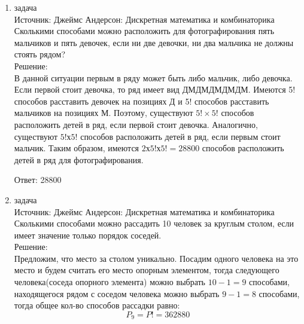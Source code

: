 \documentclass[a4paper,14pt]{extreport} %
\begin{document}
\begin{center}
\begin{enumerate}
						
						
						
						
						
						
						
						
						
						
						
						
						\item {\large задача  }\\
						Источник: Джеймс Андерсон: Дискретная математика и комбинаторика\\
						\vspace{15pt}
						Сколькими способами можно расположить для фотографирования
						пять мальчиков и пять девочек, если ни две девочки, ни два мальчика не должны
						стоять рядом? \\
						\vspace{15pt}
						Решение:\\
						В данной ситуации первым в ряду может быть либо мальчик,
						либо девочка. Если первой стоит девочка, то ряд имеет вид ДМДМДМДМДМ.
						Имеются 5! способов расставить девочек на позициях Д и 5! способов расставить
						мальчиков на позициях М. Поэтому, существуют $5! \times 5!$ способов расположить
						детей в ряд, если первой стоит девочка. Аналогично, существуют $5! х 5!$ способов
						расположить детей в ряд, если первым стоит мальчик. Таким образом, имеются
						$2 х 5! х 5! = 28800$ способов расположить детей в ряд для фотографирования.
					
						Ответ: 28800
						
						 \item {\large задача  }\\
						Источник: Джеймс Андерсон: Дискретная математика и комбинаторика\\
						\vspace{15pt}
						Сколькими способами можно рассадить 10 человек за круглым
						столом, если имеет значение только порядок соседей.\\
						\vspace{15pt}
						Решение:\\
						Предложим, что место за столом уникально. Посадим одного человека на это место
						 и будем считать его место опорным элементом,
						тогда следующего человека(соседа опорного элемента) можно выбрать $10-1=9$ способами, 
						находящегося рядом с соседом человека можно выбрать $9-1=8$ способами, тогда общее кол-во способов рассадки равно:
						\begin{equation}
							P_{9} = P! = 362880
						\end{equation}
						

\end{enumerate}
\end{center}
\end{document}

